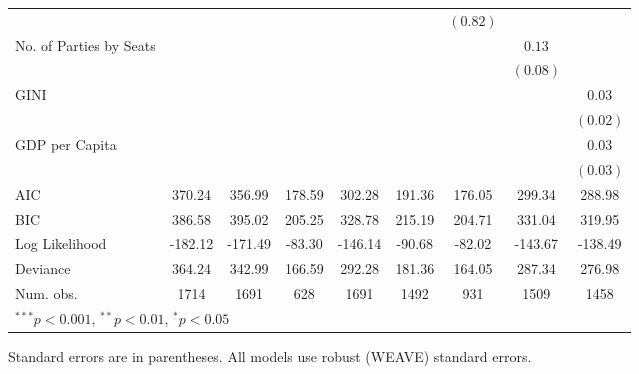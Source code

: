 \documentclass[a4paper]{article}\usepackage[]{graphicx}\usepackage[]{color}
\begin{document}
\begin{table}
\begin{center}
{\begin{tabular}{l c c c c c c c c }
                        &               &               &              &             &              & $(0.82)$     &              &              \\
No. of Parties by Seats &               &               &              &             &              &              & $0.13$       &              \\
                        &               &               &              &             &              &              & $(0.08)$     &              \\
GINI                    &               &               &              &             &              &              &              & $0.03$       \\
                        &               &               &              &             &              &              &              & $(0.02)$     \\
GDP per Capita          &               &               &              &             &              &              &              & $0.03$       \\
                        &               &               &              &             &              &              &              & $(0.03)$     \\
\hline
AIC                     & 370.24        & 356.99        & 178.59       & 302.28      & 191.36       & 176.05       & 299.34       & 288.98       \\
BIC                     & 386.58        & 395.02        & 205.25       & 328.78      & 215.19       & 204.71       & 331.04       & 319.95       \\
Log Likelihood          & -182.12       & -171.49       & -83.30       & -146.14     & -90.68       & -82.02       & -143.67      & -138.49      \\
Deviance                & 364.24        & 342.99        & 166.59       & 292.28      & 181.36       & 164.05       & 287.34       & 276.98       \\
Num. obs.               & 1714          & 1691          & 628          & 1691        & 1492         & 931          & 1509         & 1458         \\
\hline
\multicolumn{9}{l}{\scriptsize{$^{***}p<0.001$, $^{**}p<0.01$, $^*p<0.05$}}
\end{tabular}

}
\end{center}
{\scriptsize{
    Standard errors are in parentheses. All models use robust (WEAVE) standard errors. \\
}}
\end{table}
\end{document}
